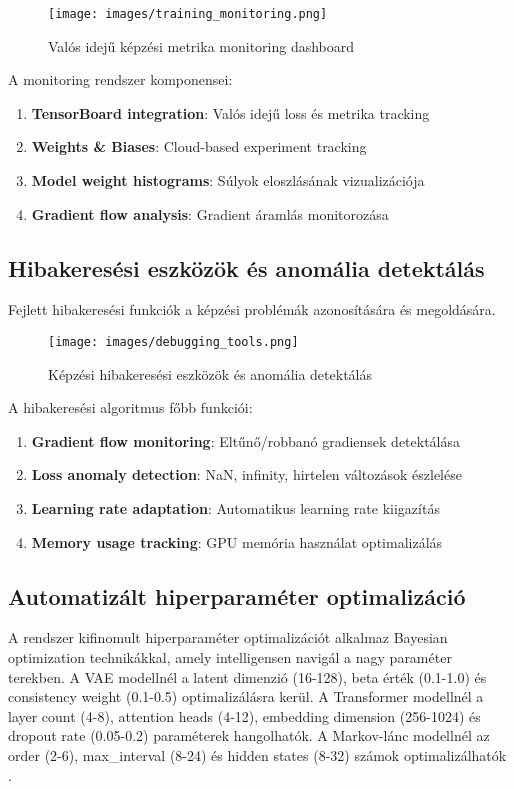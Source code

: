\begin{figure}[h]
\centering
\texttt{[image: images/training\_monitoring.png]}
\caption{Valós idejű képzési metrika monitoring dashboard}
\label{fig:monitoring}
\end{figure}

A monitoring rendszer komponensei:
\begin{enumerate}
\item \textbf{TensorBoard integration}: Valós idejű loss és metrika tracking
\item \textbf{Weights \& Biases}: Cloud-based experiment tracking
\item \textbf{Model weight histograms}: Súlyok eloszlásának vizualizációja
\item \textbf{Gradient flow analysis}: Gradient áramlás monitorozása
\end{enumerate}

\subsection{Hibakeresési eszközök és anomália detektálás}
Fejlett hibakeresési funkciók a képzési problémák azonosítására és megoldására.

\begin{figure}[h]
\centering
\texttt{[image: images/debugging\_tools.png]}
\caption{Képzési hibakeresési eszközök és anomália detektálás}
\label{fig:debugging}
\end{figure}

A hibakeresési algoritmus főbb funkciói:
\begin{enumerate}
\item \textbf{Gradient flow monitoring}: Eltűnő/robbanó gradiensek detektálása
\item \textbf{Loss anomaly detection}: NaN, infinity, hirtelen változások észlelése
\item \textbf{Learning rate adaptation}: Automatikus learning rate kiigazítás
\item \textbf{Memory usage tracking}: GPU memória használat optimalizálás
\end{enumerate}

\subsection{Automatizált hiperparaméter optimalizáció}
A rendszer kifinomult hiperparaméter optimalizációt alkalmaz Bayesian optimization technikákkal, amely intelligensen navigál a nagy paraméter terekben. A VAE modellnél a latent dimenzió (16-128), beta érték (0.1-1.0) és consistency weight (0.1-0.5) optimalizálásra kerül. A Transformer modellnél a layer count (4-8), attention heads (4-12), embedding dimension (256-1024) és dropout rate (0.05-0.2) paraméterek hangolhatók. A Markov-lánc modellnél az order (2-6), max_interval (8-24) és hidden states (8-32) számok optimalizálhatók \cite{optuna2019}.


